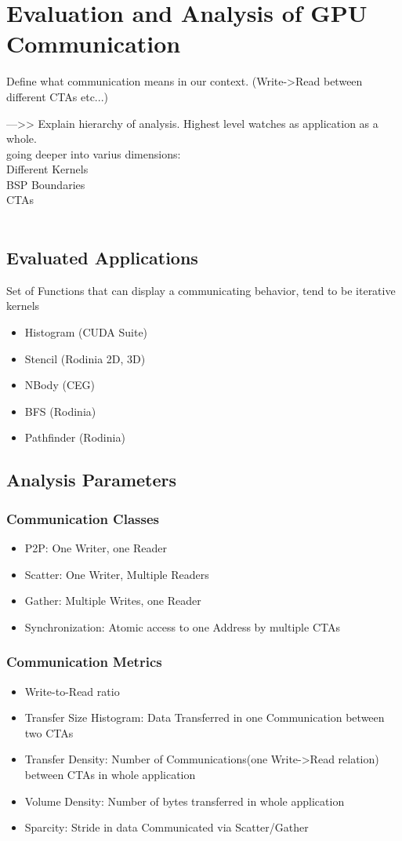 \chapter{Evaluation and Analysis of GPU Communication}\label{eval}
Define what communication means in our context. (Write->Read between different CTAs etc...)

--->> Explain hierarchy of analysis. Highest level watches as application as a whole. \\
going deeper into varius dimensions:\\
Different Kernels\\
BSP Boundaries\\
CTAs\\\\

\section{Evaluated Applications}
	Set of Functions that can display a communicating behavior, tend to be iterative kernels
\begin{itemize}
	\item Histogram (CUDA Suite)
	\item Stencil (Rodinia 2D, 3D)
	\item NBody (CEG)
	\item BFS (Rodinia)
	\item Pathfinder (Rodinia)
\end{itemize}
\section{Analysis Parameters}
\subsection{Communication Classes}
\begin{itemize}
	\item P2P: One Writer, one Reader
	\item Scatter: One Writer, Multiple Readers
	\item Gather: Multiple Writes, one Reader
	\item Synchronization: Atomic access to one Address by multiple CTAs
\end{itemize}
\subsection{Communication Metrics}
\begin{itemize}
	\item Write-to-Read ratio
	\item Transfer Size Histogram: Data Transferred in one Communication between two CTAs
	\item Transfer Density: Number of Communications(one Write->Read relation) between CTAs in whole application
	\item Volume Density: Number of bytes transferred in whole application
	\item Sparcity: Stride in data Communicated via Scatter/Gather
\end{itemize}

